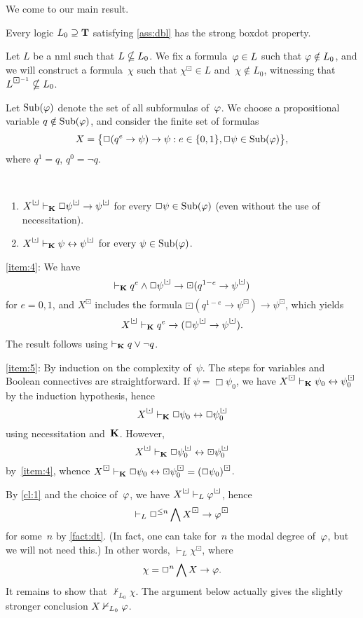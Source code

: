 \documentclass[leqno,draft,11pt]{article}
\def\bdi#1{#1^{\boxdot^{-1}}}
\begin{document}
We come to our main result.
\begin{Thm}\th\label{thm:main}
Every logic $L_0\supseteq\mathbf T$ satisfying \th\ref{ass:dbl} has the
strong boxdot property.
\end{Thm}
\begin{Pf}
Let $L$ be a nml such that $L\nsubseteq L_0$. We fix a formula~$\varphi\in L$
such that $\varphi\notin L_0$, and we will construct a formula~$\chi$
such that $\chi^\boxdot\in L$ and~$\chi\notin L_0$, witnessing that
$\bdi L\nsset L_0$.

Let $\operatorname{Sub}(\varphi)$ denote the set of all subformulas of~$\varphi$. We
choose a propositional variable $q\notin\operatorname{Sub}(\varphi)$, and consider
the finite set of formulas
\[X=\bigl\{\Box(q^e\to\psi)\to\psi:
   e\in\{0,1\},\Box\psi\in\operatorname{Sub}(\varphi)\bigr\},\]
where $q^1=q$, $q^0=\neg q$.
\begin{Cl}\th\label{cl:1}\
\begin{enumerate}
\item\label{item:4}
$X^\boxdot\vdash_\lgc K\Box\psi^\boxdot\to\psi^\boxdot$ for
every $\Box\psi\in\operatorname{Sub}(\varphi)$ (even without the use of necessitation).
\item\label{item:5}
$X^\boxdot\vdash_\lgc K\psi\eq\psi^\boxdot$ for every $\psi\in\operatorname{Sub}(\varphi)$.
\end{enumerate}
\end{Cl}
\begin{Pf*}
\ref{item:4}: We have
\[\vdash_\lgc K 
  q^e\land\Box\psi^\boxdot\to\boxdot(q^{1-e}\to\psi^\boxdot)\]
for $e=0,1$, and $X^\boxdot$ includes the formula
$\boxdot(q^{1-e}\to\psi^\boxdot)\to\psi^\boxdot$, which yields
\[X^\boxdot\vdash_\lgc K q^e\to(\Box\psi^\boxdot\to\psi^\boxdot).\]
The result follows using $\vdash_\mathbf K q\lor\neg q$.

\ref{item:5}: By induction on the complexity of~$\psi$. The steps for
variables and Boolean connectives are straightforward. If
$\psi=\Box\psi_0$, we have $X^\boxdot\vdash_\lgc K\psi_0\eq\psi_0^\boxdot$
by the induction hypothesis, hence
\[X^\boxdot\vdash_\lgc K\Box\psi_0\eq\Box\psi_0^\boxdot\]
using necessitation and~$\mathbf K$. However,
\[X^\boxdot\vdash_\lgc K\Box\psi_0^\boxdot\eq\boxdot\psi_0^\boxdot\]
by~\ref{item:4}, whence
$X^\boxdot\vdash_\lgc K\Box\psi_0\eq\boxdot\psi_0^\boxdot=(\Box\psi_0)^\boxdot$.
\end{Pf*}
By \th\ref{cl:1} and the choice of~$\varphi$, we have
$X^\boxdot\vdash_L\fii^\boxdot$, hence
\[\vdash_L\Box^{\le n}\ET X^\boxdot\to\fii^\boxdot\]
for some~$n$ by \th\ref{fact:dt}. (In fact, one can take for~$n$ the
modal degree of~$\varphi$, but we will not need this.) In other words,
$\vdash_L\chi^\boxdot$, where
\[\chi=\Box^n\bigwedge X\to\varphi.\]
It remains to show that $\nvdash_{L_0}\chi$. The argument below
actually gives the slightly stronger conclusion $X\nvdash_{L_0}\varphi$.


\end{Pf}
\end{document}
